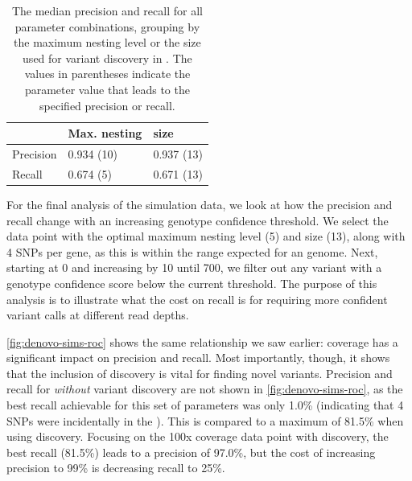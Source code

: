 \begin{table}
\centering
\begin{tabular}{@{}lll@{}}
\toprule
          & Max. nesting & \denovo{} \kmer{} size \\ \midrule
Precision & 0.934 (10)   & 0.937 (13)                                               \\
Recall    & 0.674 (5)    & 0.671 (13)                                               \\ \bottomrule
\end{tabular}
\caption{The median precision and recall for all parameter combinations, grouping by the maximum \prg{} nesting level or the \denovo{} \kmer{} size used for variant discovery in \pandora{}. The values in parentheses indicate the parameter value that leads to the specified precision or recall.}
\label{tab:denovo-summary}
\end{table}

For the final analysis of the simulation data, we look at how the precision and recall change with an increasing genotype confidence threshold. We select the data point with the optimal maximum nesting level (5) and \denovo{} \kmer{} size (13), along with 4 SNPs per gene, as this is within the range expected for an \ecoli{} genome. Next, starting at 0 and increasing by 10 until 700, we filter out any variant with a genotype confidence score below the current threshold. The purpose of this analysis is to illustrate what the cost on recall is for requiring more confident variant calls at different read depths.

\autoref{fig:denovo-sims-roc} shows the same relationship we saw earlier: coverage has a significant impact on precision and recall. Most importantly, though, it shows that the inclusion of \denovo{} discovery is vital for finding novel variants. Precision and recall for \pandora{} \emph{without} variant discovery are not shown in \autoref{fig:denovo-sims-roc}, as the best recall achievable for this set of parameters was only 1.0\% (indicating that 4 SNPs were incidentally in the \panrg{}). This is compared to a maximum of 81.5\% when using \denovo{} discovery. Focusing on the 100x coverage data point with \denovo{} discovery, the best recall (81.5\%) leads to a precision of 97.0\%, but the cost of increasing precision to 99\% is decreasing recall to 25\%. 

